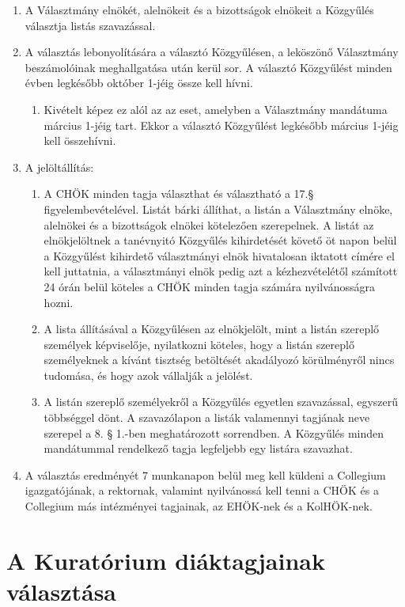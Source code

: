 \documentclass{../styles/rulebook}
\begin{document}
\begin{enumerate}
    \item A Választmány elnökét, alelnökeit és a bizottságok elnökeit a Közgyűlés választja listás szavazással.
    \item A választás lebonyolítására a választó Közgyűlésen, a leköszönő Választmány beszámolóinak meghallgatása után kerül sor. A választó Közgyűlést minden évben legkésőbb október 1-jéig össze kell hívni.
	\begin{enumerate}
        \item Kivételt képez ez alól az az eset, amelyben a Választmány mandátuma március 1-jéig tart. Ekkor a választó Közgyűlést legkésőbb március 1-jéig kell összehívni.
	\end{enumerate}
    \item A jelöltállítás:
		\begin{enumerate}
    	\item A CHÖK minden tagja választhat és választható a 17.§ figyelembevételével. Listát bárki állíthat, a listán a Választmány elnöke, alelnökei és a bizottságok elnökei kötelezően szerepelnek. A listát az elnökjelöltnek a tanévnyitó Közgyűlés kihirdetését követő öt napon belül a Közgyűlést kihirdető választmányi elnök hivatalosan iktatott címére el kell juttatnia, a választmányi elnök pedig azt a kézhezvételétől számított 24 órán belül köteles a CHÖK minden tagja számára nyilvánosságra hozni.
    	\item A lista állításával a Közgyűlésen az elnökjelölt, mint a listán szereplő személyek képviselője, nyilatkozni köteles, hogy a listán szereplő személyeknek a kívánt tisztség betöltését akadályozó körülményről nincs tudomása, és hogy azok vállalják a jelölést.
    	\item A listán szereplő személyekről a Közgyűlés egyetlen szavazással, egyszerű többséggel dönt. A szavazólapon a listák valamennyi tagjának neve szerepel a 8. § 1.-ben meghatározott sorrendben. A Közgyűlés minden mandátummal rendelkező tagja legfeljebb egy listára szavazhat.
	\end{enumerate}
    \item A választás eredményét 7 munkanapon belül meg kell küldeni a Collegium igazgatójának, a rektornak, valamint nyilvánossá kell tenni a CHÖK és a Collegium más intézményei tagjainak, az EHÖK-nek és a KolHÖK-nek.
\end{enumerate}


\section{A Kuratórium diáktagjainak választása}
\end{document}
